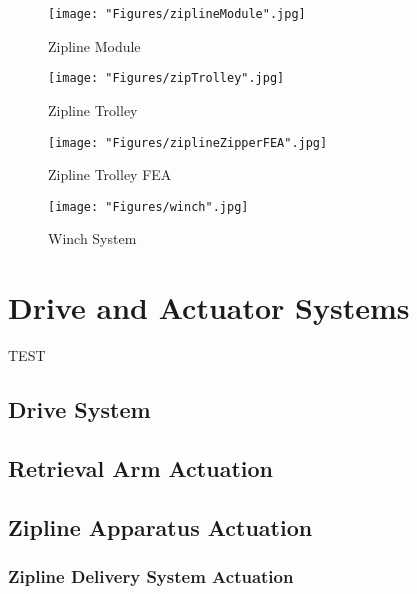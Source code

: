 \documentclass[11pt, oneside]{article} %
\begin{document}
		\newpage
		
		\begin{figure}[h]
			\centering
			\begin{minipage}[t]{.5\textwidth}
				\centering
				\texttt{[image: "Figures/ziplineModule".jpg]}
				\caption[Zipline Module]{Zipline Module}
				\label{fig:zipModule}
			\end{minipage}%
			\begin{minipage}[t]{.5\textwidth}
				\centering
				\texttt{[image: "Figures/zipTrolley".jpg]}
				\caption[Zipline Trolley]{Zipline Trolley}
				\label{fig:zipTrolley}
			\end{minipage}
		\end{figure}	
		
		\begin{figure}[h]
			\centering
			\begin{minipage}[t]{.5\textwidth}
				\centering
				\texttt{[image: "Figures/ziplineZipperFEA".jpg]}
				\caption[Zipline Trolley FEA]{Zipline Trolley FEA}
				\label{fig:zipFEA}
			\end{minipage}%
			\begin{minipage}[t]{.5\textwidth}
				\centering
				\texttt{[image: "Figures/winch".jpg]}
				\caption[WinchSystem]{Winch System}
				\label{fig:winch}
			\end{minipage}
		\end{figure}
			
\section{Drive and Actuator Systems}


TEST
	\subsection{Drive System}
	
	\subsection{Retrieval Arm Actuation}
	
	\subsection{Zipline Apparatus Actuation}
	
		\subsubsection{Zipline Delivery System Actuation}
		
\end{document}
